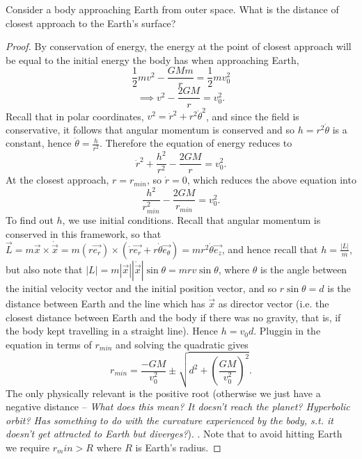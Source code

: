 \begin{example}
  Consider a body approaching Earth from outer space. What is the distance of
  closest approach to the Earth's surface?
\end{example}
\begin{proof}
  By conservation of energy, the energy at the point of closest approach will be
  equal to the initial energy the body has when approaching Earth,
  \[\frac{1}{2}mv^2 - \frac{GMm}{r} = \frac{1}{2}mv_0^2\]
  \[\implies v^2 - \frac{2GM}{r} = v_0^2.\]
  Recall that in polar coordinates, $v^2 = \dot{r}^2 + r^2 \dot{\theta}^2$, and
  since the field is conservative, it follows that angular momentum is conserved
  and so $h=r^2\dot{\theta}$ is a constant, hence
  $\dot{\theta}=\frac{h}{r^2}$. Therefore the equation of energy reduces to 
  \[\dot{r}^2 + \frac{h^2}{r^2} - \frac{2GM}{r} = v_0^2.\]
  At the closest approach, $r=r_{min}$, so $\dot{r}=0$, which reduces the above
  equation into
  \[\frac{h^2}{r_{min}^2} - \frac{2GM}{r_{min}}=v_0^2.\]
  To find out $h$, we use initial conditions. Recall that angular momentum is
  conserved in this framework, so that
  $\vec{L}=m\vec{x}\times\dot{\vec{x}}=m(r\vec{e_r})\times
  (\dot{r}\vec{e_r}+r\dot{\theta}\vec{e_{\theta}})=mr^2\dot{\theta}\vec{e_z}$,
  and hence recall that $h=\frac{|L|}{m}$, but also note that
  $|L|=m|\vec{x}||\dot{\vec{x}}|\sin \theta=mrv\sin\theta$, where $\theta$ is
  the angle between the initial velocity vector and the initial position vector,
  and so $r\sin\theta=d$ is the distance between Earth and the line which has
  $\dot{\vec{x}}$ as director vector (i.e. the closest distance between Earth
    and the body if there was no gravity, that is, if the body kept travelling
  in a straight line). Hence $h=v_0 d$. Pluggin in the equation in terms of
  $r_{min}$ and solving the quadratic gives
  \[r_{min}=\frac{-GM}{v_0^2} \pm \sqrt{d^2 + (\frac{GM}{v_0^2})^2}.\]
  The only physically relevant is the positive root (otherwise we just have a
  negative distance -- \emph{What does this mean? It doesn't reach the
  planet? Hyperbolic orbit? Has something to do with the curvature experienced by
  the body, s.t. it doesn't get attracted to Earth but diverges?}).
  .
  Note that to avoid hitting Earth we require $r_min> R$ where $R$ is Earth's
  radius.
\end{proof}
